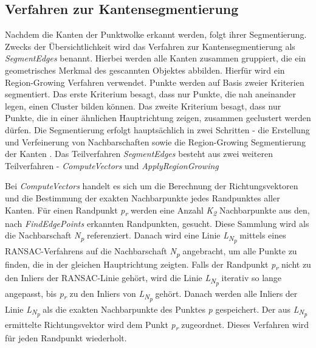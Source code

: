 \subsection{Verfahren zur Kantensegmentierung} \label{edge_segmentation}
Nachdem die Kanten der Punktwolke erkannt werden, folgt ihrer Segmentierung. Zwecks der Übersichtlichkeit wird das Verfahren zur Kantensegmentierung als \textit{SegmentEdges} benannt. Hierbei werden alle Kanten zusammen gruppiert, die ein geometrisches Merkmal des gescannten Objektes abbilden. Hierfür wird ein Region-Growing Verfahren verwendet. Punkte werden auf Basis zweier Kriterien segmentiert. Das erste Kriterium besagt, dass nur Punkte, die nah aneinander legen, einen Cluster bilden können. Das zweite Kriterium besagt, dass nur Punkte, die in einer ähnlichen Hauptrichtung zeigen, zusammen geclustert werden dürfen. Die Segmentierung erfolgt hauptsächlich in zwei Schritten - die Erstellung und Verfeinerung von Nachbarschaften sowie die Region-Growing Segmentierung der Kanten \autocite{ni_edge_2016}. Das Teilverfahren \textit{SegmentEdges} besteht aus zwei weiteren Teilverfahren - \textit{ComputeVectors} und \textit{ApplyRegionGrowing}

Bei \textit{ComputeVectors} handelt es sich um die Berechnung der Richtungsvektoren und die Bestimmung der exakten Nachbarpunkte jedes Randpunktes aller Kanten. Für einen Randpunkt \textit{p\textsubscript{r}} werden eine Anzahl \textit{K\textsubscript{2}} Nachbarpunkte aus den, nach \textit{FindEdgePoints} erkannten Randpunkten, gesucht. Diese Sammlung wird als die Nachbarschaft \textit{N\textsubscript{p}} referenziert. Danach wird eine Linie \textit{L\textsubscript{N\textsubscript{p}}} mittels eines RANSAC-Verfahrens auf die Nachbarschaft \textit{N\textsubscript{p}} angebracht, um alle Punkte zu finden, die in der gleichen Hauptrichtung zeigten. Falls der Randpunkt \textit{p\textsubscript{r}} nicht zu den Inliers der RANSAC-Linie gehört, wird die Linie \textit{L\textsubscript{N\textsubscript{p}}} iterativ so lange angepasst, bis \textit{p\textsubscript{r}} zu den Inliers von \textit{L\textsubscript{N\textsubscript{p}}} gehört. Danach werden alle Inliers der Linie \textit{L\textsubscript{N\textsubscript{p}}} als die exakten Nachbarpunkte des Punktes \textit{p} gespeichert. Der aus \textit{L\textsubscript{N\textsubscript{p}}} ermittelte Richtungsvektor wird dem Punkt \textit{p\textsubscript{r}} zugeordnet. Dieses Verfahren wird für jeden Randpunkt wiederholt.

